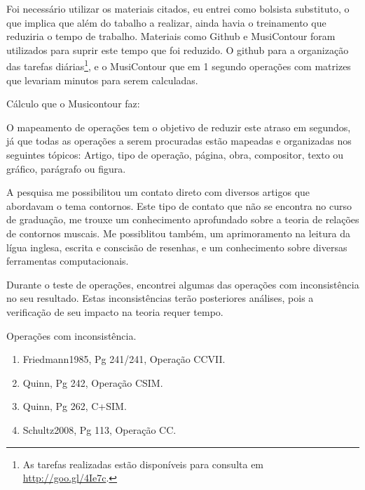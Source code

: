 \documentclass[11pt]{article}
\begin{document}

Foi necessário utilizar os materiais citados, eu entrei como bolsista
substituto, o que implica que além do tabalho a realizar, ainda havia
o treinamento que reduziria o tempo de trabalho. Materiais como Github
e MusiContour foram utilizados para suprir este tempo que foi
reduzido. O github para a organização das tarefas diárias\footnote{As
  tarefas realizadas estão disponíveis para consulta em
  \url{http://goo.gl/4Ie7c}.}, e o MusiContour que em 1 segundo
operações com matrizes que levariam minutos para serem calculadas.

Cálculo que o Musicontour faz:


O mapeamento de operações tem o objetivo de reduzir este atraso em
segundos, já que todas as operações a serem procuradas estão mapeadas
e organizadas nos seguintes tópicos: Artigo, tipo de operação, página,
obra, compositor, texto ou gráfico, parágrafo ou figura.

A pesquisa me possibilitou um contato direto com diversos artigos que abordavam
o tema contornos. Este tipo de contato que não se encontra no curso de graduação,
me trouxe um conhecimento aprofundado sobre a teoria de relações de contornos muscais.
Me possiblitou também, um aprimoramento na leitura da lígua inglesa, escrita e conscisão
de resenhas, e um conhecimento sobre diversas ferramentas computacionais.

Durante o teste de operações, encontrei algumas das operações com
inconsistência no seu resultado. Estas inconsistências terão posteriores
análises, pois a verificação de seu impacto na teoria requer tempo.

Operações com inconsistência.
\begin{enumerate}
\item Friedmann1985, Pg 241/241, Operação CCVII.
\item Quinn, Pg 242, Operação CSIM.
\item Quinn, Pg 262, C+SIM.
\item Schultz2008, Pg 113, Operação CC.
\end{enumerate}
\end{document}
